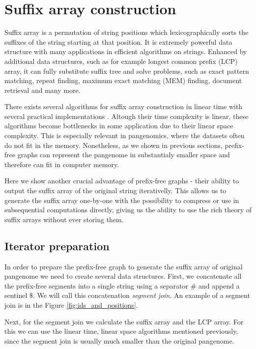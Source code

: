 \section{Suffix array construction}
Suffix array is a permutation of string positions which lexicographically
sorts the suffixes of the string starting at that position.
It is extremely powerful data structure with many applications in efficient
algorithms on strings.
Enhanced by additional data structures, such as for example longest common
prefix (LCP) array, it can fully substitute suffix tree and solve problems,
such as exact pattern matching, repeat finding, maximum exact matching (MEM)
finding, document retrieval and many more.

There exists several algorithms for suffix array construction in linear time
\cite{} with several practical implementations \cite{}.
Altough their time complexity is linear, these algorithms become bottlenecks in
some application due to their linear space complexity.
This is especially relevant in pangenomics, where the datasets often do not fit
in the memory.
Nonetheless, as we shown in previous sections, prefix-free graphs can represent
the pangenome in substantialy smaller space and therefore can fit in computer
memory.

Here we show another crucial advantage of prefix-free graphs - their ability to
output the suffix array of the original string iterativelly.
This allows us to generate the suffix array one-by-one with the possibility
to compress or use in subsequential computations directly, giving us the ability
to use the rich theory of suffix arrays without ever storing them.

\subsection{Iterator preparation}
In order to prepare the prefix-free graph to generate the suffix array of
original pangenome we need to create several data structures.
First, we concatenate all the prefix-free segments into a single string using
a separator $\#$ and append a sentinel $\$$.
We will call this concatenation \emph{segment join}.
An example of a segment join is in the Figure \ref{fig:ids_and_positions}.

Next, for the segment join we calculate the suffix array and the LCP array.
For this we can use the linear time, linear space algorithms mentioned previously,
since the segment join is usually much smaller than the original pangenome.


